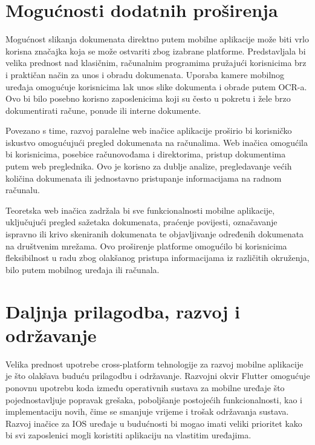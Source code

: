 		\section{Mogućnosti dodatnih proširenja}
		\par Mogućnost slikanja dokumenata direktno putem mobilne aplikacije može biti vrlo korisna značajka koja se može ostvariti zbog izabrane platforme. Predstavljala bi velika prednost nad klasičnim, računalnim programima pružajući korisnicima brz i praktičan način za unos i obradu dokumenata. Uporaba kamere mobilnog uređaja omogućuje korisnicima lak unos slike dokumenta i obrade putem OCR-a. Ovo bi bilo posebno korisno zaposlenicima koji su često u pokretu i žele brzo dokumentirati račune, ponude ili interne dokumente.
		\par Povezano s time, razvoj paralelne web inačice aplikacije proširio bi korisničko iskustvo omogućujući pregled dokumenata na računalima. Web inačica omogućila bi korisnicima, posebice računovođama i direktorima, pristup dokumentima putem web preglednika. Ovo je korisno za dublje analize, pregledavanje većih količina dokumenata ili jednostavno pristupanje informacijama na radnom računalu.
		\par Teoretska web inačica zadržala bi sve funkcionalnosti mobilne aplikacije, uključujući pregled sažetaka dokumenata, praćenje povijesti, označavanje ispravno ili krivo skeniranih dokumenata te objavljivanje određenih dokumenata na društvenim mrežama. Ovo proširenje platforme omogućilo bi korisnicima fleksibilnost u radu zbog olakšanog pristupa informacijama iz različitih okruženja, bilo putem mobilnog uređaja ili računala.
		\eject
		\section{Daljnja prilagodba, razvoj i održavanje}
		Velika prednost upotrebe cross-platform tehnologije za razvoj mobilne aplikacije je što olakšava buduću prilagodbu i održavanje. Razvojni okvir Flutter omogućuje ponovnu upotrebu koda između operativnih sustava za mobilne uređaje što pojednostavljuje popravak grešaka, poboljšanje postojećih funkcionalnosti, kao i implementaciju novih, čime se smanjuje vrijeme i trošak održavanja sustava. Razvoj inačice za IOS uređaje u budućnosti bi mogao imati veliki prioritet kako bi svi zaposlenici mogli koristiti aplikaciju na vlastitim uređajima.
		\eject
		
	